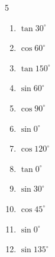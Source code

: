 \begin{multicols}{5}
\begin{enumerate}
        \phantom{$\displaystyle =0$}

  \item $\displaystyle \tan{30^\circ}$


  \item $\displaystyle \cos{60^\circ}$


  \item $\displaystyle \tan{150^\circ}$


  \item $\displaystyle \sin{60^\circ}$


  \item $\displaystyle \cos{90^\circ}$

        \phantom{$\displaystyle =0$}

  \item $\displaystyle \sin{0^\circ}$

        \phantom{$\displaystyle =0$}

  \item $\displaystyle \cos{120^\circ}$


  \item $\displaystyle \tan{0^\circ}$

        \phantom{$\displaystyle =0$}

  \item $\displaystyle \sin{30^\circ}$


  \item $\displaystyle \cos{45^\circ}$


  \item $\displaystyle \sin{0^\circ}$

        \phantom{$\displaystyle =0$}

  \item $\displaystyle \sin{135^\circ}$


\columnbreak %


\end{enumerate}
\end{multicols}
